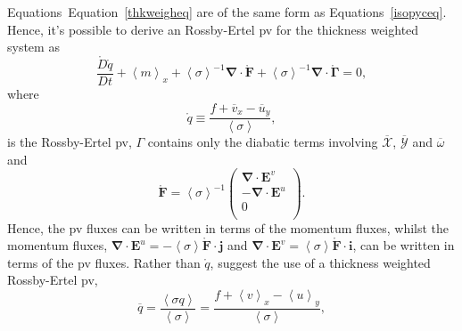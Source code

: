 \documentclass[10pt,a4paper]{report}
\newcommand*\thkmean[1]{\overline{#1}}
\newcommand*\nthkmean[1]{\left\langle{#1}\right\rangle}
\newcommand*\spec[1]{\mathring{#1}}
\newcommand*\equref[1]{Equation~\eqref{#1}}
\begin{document}
                      Equations~\equref{thkweigheq} are of the same form as Equations~\ref{isopyceq}.
                      Hence, it's possible to derive an
                      Rossby-Ertel \gls{pv} for the thickness weighted system
                      as
                      \begin{equation}
                      \frac{\spec{D} \spec{q}}{D t} + \nthkmean{m}_{x} 
                      +\nthkmean{\sigma}^{-1}\boldsymbol{\nabla}\cdot\spec{\boldsymbol{F}}
                      +\nthkmean{\sigma}^{-1}\boldsymbol{\nabla}\cdot\spec{\boldsymbol{\Gamma}}=0,
                      \end{equation} 
                      where
                      \begin{equation}
                      \spec{q}\equiv\frac{f+\thkmean{v}_{x}-\thkmean{u}_{y}}{\nthkmean{\sigma}},
                      \end{equation}
                      is the Rossby-Ertel \gls{pv}, $\Gamma$ contains only the diabatic terms involving $\thkmean{\mathcal{X}} $, $\thkmean{\mathcal{Y}} $ and $\thkmean{\omega} $ and 
                      \begin{equation}
                      \spec{\boldsymbol{F}}=\nthkmean{\sigma}^{-1}\left(
                      \begin{array}{c}
                      \boldsymbol{\nabla}\cdot\boldsymbol{E}^v \\
                      -\boldsymbol{\nabla}\cdot\boldsymbol{E}^u\\
                      0 \\
                      \end{array}\right).
                      \end{equation}
                      Hence, the \gls{pv} fluxes can be written in terms of
                      the momentum fluxes, whilst the momentum fluxes, ${\boldsymbol{\nabla}\cdot\boldsymbol{E}^u = -\nthkmean{\sigma} \spec{\boldsymbol{F}}\cdot\boldsymbol{j}}$ and                      ${\boldsymbol{\nabla}\cdot\boldsymbol{E}^v = \nthkmean{\sigma} \spec{\boldsymbol{F}}\cdot\boldsymbol{i}}$,
                      can be written in terms of the \gls{pv} fluxes.
                      Rather than $\spec{q}$, \cite{greatbatch1998exploring} suggest
                      the use of a thickness weighted Rossby-Ertel \gls{pv},
                      \begin{equation}
                      \thkmean{q}=\frac{\nthkmean{\sigma q}}{\nthkmean{\sigma}}=\frac{f+\nthkmean{v}_{x}-\nthkmean{u}_{y}}{\nthkmean{\sigma}},
                      \end{equation}
\end{document}
